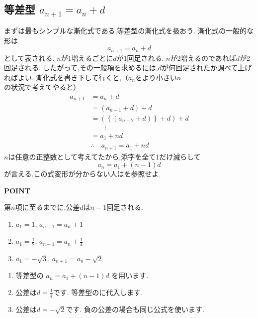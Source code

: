 
\subsection{\texorpdfstring{等差型  $a_{n+1}=a_n+d$}{等差型}}\label{節：等差型}
まずは最もシンプルな漸化式である,等差型の漸化式を扱おう.
漸化式の一般的な形は
\[
  a_{n+1}=a_n+d
\]
として表される.
$n$が1増えるごとに$d$が1回足される.
$n$が2増えるのであれば$d$が2回足される.
したがって,その一般項を求めるには,$d$が何回足されたか調べて上げればよい.
漸化式を書き下して行くと,（$a_n$をより小さい$n$の状況で考えてやると）
\begin{align*}
  a_{n+1}&=a_{n}+d\\
  &=(a_{n-1}+d)+d\\
  &=(\left\{(a_{n-2}+d)\right\}+d)+d\\
  &\qquad \vdots\\
  &=a_1+nd\\
  &\therefore \quad a_{n+1}=a_1+nd
\end{align*}
$n$は任意の正整数として考えてたから,添字を全て1だけ減らして
\[
  a_n=a_1+(n-1)d
\]
が言える.この式変形が分からない人はを参照せよ.
\begin{bookpoint}
  \textbf{POINT}\par
  第$n$項に至るまでに,公差$d$は$n-1$回足される.
\end{bookpoint}


\noindent {}\par\nobreak
\begin{enumerate}[label=(\arabic*),parsep=3pt,format=\bookitemlink{example-arithmetic-1}{problem}{answer}]
  \item $\displaystyle a_1=1,\, a_{n+1}=a_n+1$
  \item $\displaystyle a_1=\frac{1}{2},\, a_{n+1}=a_n+\frac{1}{4}$
  \item $\displaystyle a_1=-\sqrt{3},\, a_{n+1}=a_n-\sqrt{2}$
\end{enumerate}

\noindent{}\par\nobreak
\begin{enumerate}[label=(\arabic*),parsep=3pt,format=\bookitemlink{example-arithmetic-1}{hint}{problem}]
  \item 等差型の
    $\displaystyle a_n=a_1+(n-1)d$
    を用います.
  \item 公差は$\displaystyle d=\frac14$です.
    等差型のに代入します.
  \item 公差は$\displaystyle d=-\sqrt2$です.
    負の公差の場合も同じ公式を使います.
\end{enumerate}

